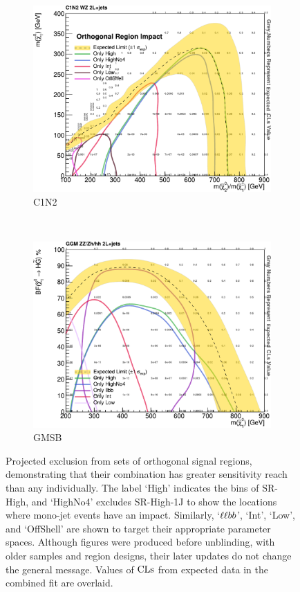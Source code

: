 \begin{figure}[tp]
\centering
\begin{subfigure}{0.7\textwidth}
\centering
\includegraphics[width=\textwidth]{figures/2ljets_fit_multi_contours_c1n2.pdf}
\caption{C1N2}
\end{subfigure}
\\
\begin{subfigure}{0.7\textwidth}
\centering
\includegraphics[width=\textwidth]{figures/2ljets_fit_multi_contours_gmsb.pdf}
\caption{GMSB}
\end{subfigure}
\caption[
Projected exclusion from sets of orthogonal signal regions
]{%
Projected exclusion from sets of orthogonal signal regions, demonstrating that
their combination has greater sensitivity reach than any individually.
The label `High' indicates the bins of SR-High, and `HighNo4' excludes
SR-High-1J to show the locations where mono-jet events have an impact.
Similarly, `$\ell\ell bb$', `Int', `Low', and `OffShell' are shown to target their
appropriate parameter spaces.
Although figures were produced before unblinding, with older samples and region
designs, their later updates do not change the general message.
Values of $\mathrm{CLs}$ from expected data in the combined fit are overlaid.
}
\label{fig:2ljets_fit_multi_contours}
\end{figure}

